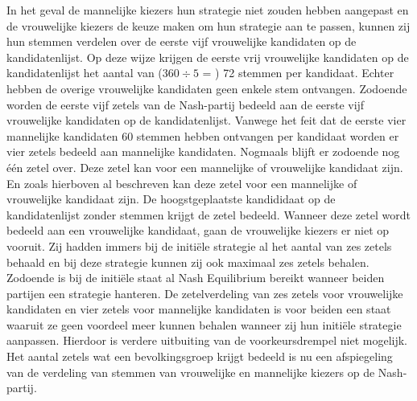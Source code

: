\indent In het geval de mannelijke kiezers hun strategie niet zouden hebben aangepast en de vrouwelijke kiezers de keuze maken om hun strategie aan te passen, kunnen zij hun stemmen verdelen over de eerste vijf vrouwelijke kandidaten op de kandidatenlijst. Op deze wijze krijgen de eerste vrij vrouwelijke kandidaten op de kandidatenlijst het aantal van ($360\div5$ = ) 72 stemmen per kandidaat. Echter hebben de overige vrouwelijke kandidaten geen enkele stem ontvangen. Zodoende worden de eerste vijf zetels van de Nash-partij bedeeld aan de eerste vijf vrouwelijke kandidaten op de kandidatenlijst. Vanwege het feit dat de eerste vier mannelijke kandidaten 60 stemmen hebben ontvangen per kandidaat worden er vier zetels bedeeld aan mannelijke kandidaten. Nogmaals blijft er zodoende nog één zetel over. Deze zetel kan voor een mannelijke of vrouwelijke kandidaat zijn. En zoals hierboven al beschreven kan deze zetel voor een mannelijke of vrouwelijke kandidaat zijn. De hoogstgeplaatste kandididaat op de kandidatenlijst zonder stemmen krijgt de zetel bedeeld. Wanneer deze zetel wordt bedeeld aan een vrouwelijke kandidaat, gaan de vrouwelijke kiezers er niet op vooruit. Zij hadden immers bij de initi\"{e}le strategie al het aantal van zes zetels behaald en bij deze strategie kunnen zij ook maximaal zes zetels behalen. \\
\indent Zodoende is bij de initi\"{e}le staat al Nash Equilibrium bereikt wanneer beiden partijen een strategie hanteren. De zetelverdeling van zes zetels voor vrouwelijke kandidaten en vier zetels voor mannelijke kandidaten is voor beiden een staat waaruit ze geen voordeel meer kunnen behalen wanneer zij hun initi\"{e}le strategie aanpassen. Hierdoor is verdere uitbuiting van de voorkeursdrempel niet mogelijk. Het aantal zetels wat een bevolkingsgroep krijgt bedeeld is nu een afspiegeling van de verdeling van stemmen van vrouwelijke en mannelijke kiezers op de Nash-partij. 



